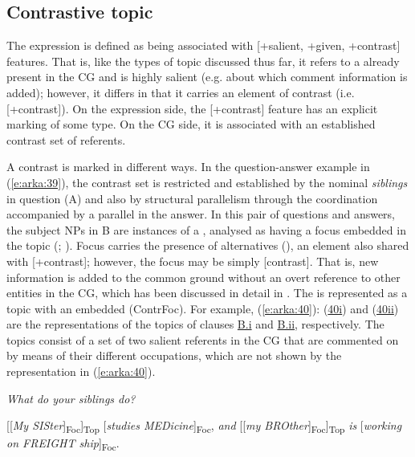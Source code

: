 \documentclass[output=paper
,modfonts
,nonflat]{langsci/langscibook}
\begin{document}
\subsection{\label{s5.5}Contrastive topic}

The  expression is defined as being associated with [+salient, +given, +contrast] features. That is, like the types of topic discussed thus far, it refers to a  already present in the CG and is highly salient (e.g. about which comment information is added); however, it differs in that it carries an element of contrast (i.e. [+contrast]). On the expression side, the [+contrast] feature has an explicit marking of some type. On the CG side, it is associated with an established contrast set of referents. 

A contrast is marked in different ways. In the  question-answer example in (\ref{e:arka:39}), the contrast set is restricted and established by the nominal \textit{siblings} in question (A) and also by structural parallelism through the coordination accompanied by a parallel  in the answer. In this pair of questions and answers, the subject NPs in B are instances of a , analysed as having a focus embedded in the topic (\citealt{Erteschick-Shir2007}; \citealt[30]{Krifka2012}). Focus carries the presence of alternatives (\citealt{Krifka2012}), an element also shared with [+contrast]; however, the focus may be simply [\textminus contrast]. That is, new information is added to the common ground without an overt  reference to other entities in the CG, which has been discussed in detail in . The  is represented as a topic with an embedded  (ContrFoc). For example, (\ref{e:arka:40}): (\hyperref[e40i]{40i}) and (\hyperref[e40ii]{40ii}) are the representations of the  topics of clauses \hyperref[e39bi]{B.i} and \hyperref[e39bii]{B.ii}, respectively. The topics consist of a set of two salient referents in the CG that are commented on by means of their different occupations, which are not shown by the representation in (\ref{e:arka:40}).

\begin{exe}
	\ex\label{e:arka:39} \begin{xlist}
		 \textit{What do your siblings do?}
		\begin{xlist}
			\ex\label{e39bi}{[[\textit{My SISter}]\textsubscript{Foc}]\textsubscript{Top}   [\textit{studies  MEDicine}]\textsubscript{Foc}, \textit{and}}
			\ex\label{e39bii}{[[\textit{my BROther}]\textsubscript{Foc}]\textsubscript{Top} \textit{is} 
			[\textit{working on FREIGHT ship}]\textsubscript{Foc}.
			\citep[30]{Krifka2012}}
		\end{xlist}
	\end{xlist}
\end{exe}
\end{document}
